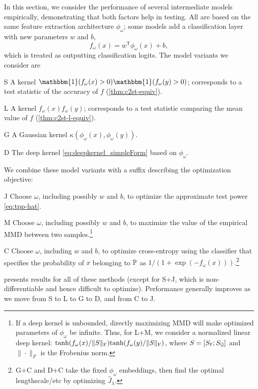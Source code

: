 \documentclass{article}
\newcommand{\tp}{^\mathsf{T}}
\begin{document}
In this section, we consider the performance of several intermediate models empirically,
demonstrating that both factors help in testing.
All are based on the same feature extraction architecture $\phi_\omega$;
some models add a classification layer with new parameters $w$ and $b$,
\[
    f_\omega(x) = w\tp \phi_\omega(x) + b
,\]
which is treated as outputting classification logits.
The model variants we consider are
\begin{compactdesc}
\item[S] A kernel $\mathbbm{1}(f_\omega(x) > 0) \mathbbm{1}(f_\omega(y) > 0)$; corresponds to a test statistic of the accuracy of $f$ (\cref{thm:c2st-equiv}).
\item[L] A kernel $f_\omega(x) f_\omega(y)$; corresponds to a test statistic comparing the mean value of $f$ (\cref{thm:c2st-l-equiv}).
\item[G] A Gaussian kernel $\kappa(\phi_\omega(x),\phi_\omega(y))$.
\item[D] The deep kernel \eqref{eq:deepkernel_simpleForm} based on $\phi_\omega$.
\end{compactdesc}
We combine these model variants with a suffix describing the optimization objective:
\begin{compactdesc}
    \item[J] Choose $\omega$, including possibly $w$ and $b$, to optimize the approximate test power \eqref{eq:tpp-hat}.
    \item[M] Choose $\omega$, including possibly $w$ and $b$, to maximize the value of the empirical MMD between two samples.\footnote{If a deep kernel is unbounded, directly maximizing MMD will make optimized parameters of $\phi_\omega$ be infinite. Thus, for L+M, we consider a normalized linear deep kernel: $\textnormal{tanh}(f_\omega(x)/\|S\|_\textnormal{F})\textnormal{tanh}(f_\omega(y)/\|S\|_\textnormal{F})$, where $S = [S_\P;S_\Q]$ and $\|\cdot\|_F$ is the Frobenius norm.}
    \item[C] Choose $\omega$, including $w$ and $b$, to optimize cross-entropy using the classifier that specifies the probability of $x$ belonging to $\P$ as $1 / \left( 1 + \exp(- f_\omega(x) ) \right)$.\footnote{G+C and D+C take the fixed $\phi_\omega$ embeddings, then find the optimal lengthscale/etc by optimizing $\hat J_\lambda$.}
\end{compactdesc}


 presents results for all of these methods
(except for S+J, which is non-differentiable and hence difficult to optimize).
Performance generally improves
as we move from S to L to G to D,
and from C to J.
\end{document}

